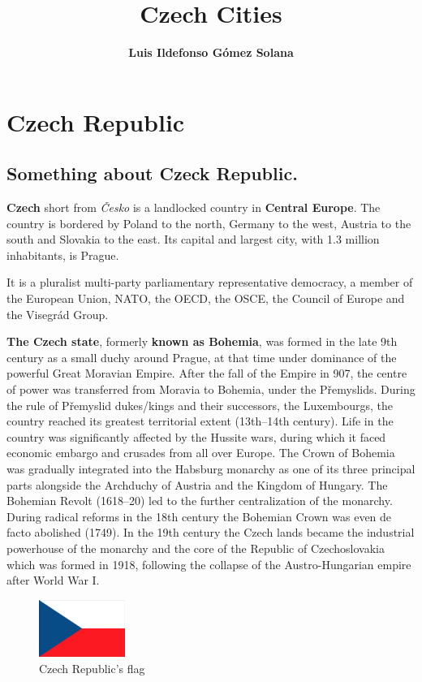 \documentclass[a4paper, 12pt]{report}
\begin{document}
\title{\textbf{Czech Cities}}
\author{\textbf{Luis Ildefonso Gómez Solana}}
\maketitle
\tableofcontents

\chapter{Czech Republic}
\section{Something about Czeck Republic.}
	\textbf{Czech} short from  \emph{Česko} is a landlocked country in \textbf{Central Europe}. The country is bordered by Poland to the north, Germany to the west, Austria to the south and Slovakia to the east. Its capital and largest city, with 1.3 million inhabitants, is Prague.


	It is a pluralist multi-party parliamentary representative democracy, a member of the European Union, NATO, the OECD, the OSCE, the Council of Europe and the Visegrád Group.


	\textbf{The Czech state}, formerly \textbf{known as Bohemia}, was formed in the late 9th century as a small duchy around Prague, at that time under dominance of the powerful Great Moravian Empire. After the fall of the Empire in 907, the centre of power was transferred from Moravia to Bohemia, under the Přemyslids. During the rule of Přemyslid dukes/kings and their successors, the Luxembourgs, the country reached its greatest territorial extent (13th–14th century). Life in the country was significantly affected by the Hussite wars, during which it faced economic embargo and crusades from all over Europe. The Crown of Bohemia was gradually integrated into the Habsburg monarchy as one of its three principal parts alongside the Archduchy of Austria and the Kingdom of Hungary. The Bohemian Revolt (1618–20) led to the further centralization of the monarchy. During radical reforms in the 18th century the Bohemian Crown was even de facto abolished (1749). In the 19th century the Czech lands became the industrial powerhouse of the monarchy and the core of the Republic of Czechoslovakia which was formed in 1918, following the collapse of the Austro-Hungarian empire after World War I.
\begin{figure}
	\begin{center}
		\includegraphics[width=0.25\textwidth]{cz.jpg}
	\end{center}
	\caption{Czech Republic's flag}
\end{figure}
\end{document}
